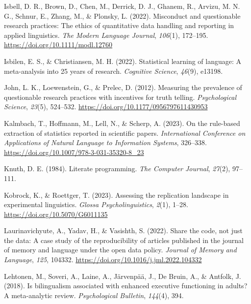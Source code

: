\documentclass[
  doc,
  longtable,
  nolmodern,
  notxfonts,
  notimes,
  colorlinks=true,linkcolor=blue,citecolor=blue,urlcolor=blue]{apa7}
\newlength{\cslhangindent}
\newenvironment{CSLReferences}[2] %
 {\begin{list}{}{%
  \setlength{\itemindent}{0pt}
  \setlength{\leftmargin}{0pt}
  \setlength{\parsep}{0pt}
  \ifodd #1
   \setlength{\leftmargin}{\cslhangindent}
   \setlength{\itemindent}{-1\cslhangindent}
  \fi
  \setlength{\itemsep}{#2\baselineskip}}}
 {\end{list}}
\begin{document}
\begin{CSLReferences}{1}{0}
Isbell, D. R., Brown, D., Chen, M., Derrick, D. J., Ghanem, R., Arvizu,
M. N. G., Schnur, E., Zhang, M., \& Plonsky, L. (2022). Misconduct and
questionable research practices: The ethics of quantitative data
handling and reporting in applied linguistics. \emph{The Modern Language
Journal}, \emph{106}(1), 172--195.
\url{https://doi.org/10.1111/modl.12760}

Isbilen, E. S., \& Christiansen, M. H. (2022). Statistical learning of
language: A meta-analysis into 25 years of research. \emph{Cognitive
Science}, \emph{46}(9), e13198.

John, L. K., Loewenstein, G., \& Prelec, D. (2012). Measuring the
prevalence of questionable research practices with incentives for truth
telling. \emph{Psychological Science}, \emph{23}(5), 524--532.
\url{https://doi.org/10.1177/0956797611430953}

Kalmbach, T., Hoffmann, M., Lell, N., \& Scherp, A. (2023). On the
rule-based extraction of statistics reported in scientific papers.
\emph{International Conference on Applications of Natural Language to
Information Systems}, 326--338.
\url{https://doi.org/10.1007/978-3-031-35320-8_23}

Knuth, D. E. (1984). Literate programming. \emph{The Computer Journal},
\emph{27}(2), 97--111.

Kobrock, K., \& Roettger, T. (2023). Assessing the replication landscape
in experimental linguistics. \emph{Glossa Psycholinguistics},
\emph{2}(1), 1--28. \url{https://doi.org/10.5070/G6011135}

Laurinavichyute, A., Yadav, H., \& Vasishth, S. (2022). Share the code,
not just the data: A case study of the reproducibility of articles
published in the journal of memory and language under the open data
policy. \emph{Journal of Memory and Language}, \emph{125}, 104332.
\url{https://doi.org/10.1016/j.jml.2022.104332}

Lehtonen, M., Soveri, A., Laine, A., Järvenpää, J., De Bruin, A., \&
Antfolk, J. (2018). Is bilingualism associated with enhanced executive
functioning in adults? A meta-analytic review. \emph{Psychological
Bulletin}, \emph{144}(4), 394.


\end{CSLReferences}
\end{document}
